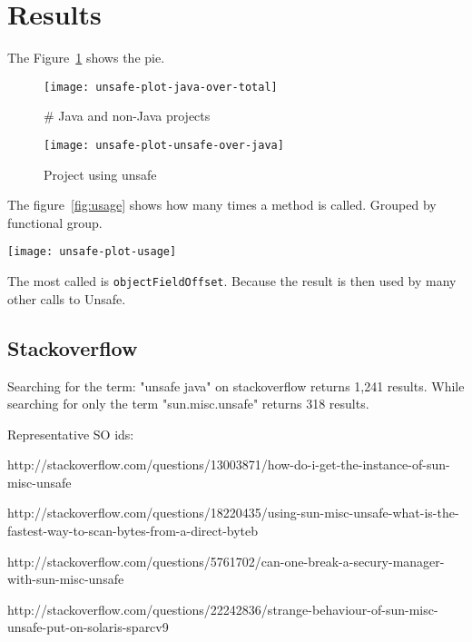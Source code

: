 
\section{Results} \label{sec:results}

The Figure~\ref{fig:java-over-total} shows the pie.

\begin{figure}[htb]
\centering
\texttt{[image: unsafe-plot-java-over-total]}
\caption{\# Java and non-Java projects} \label{fig:java-over-total}
\end{figure}

\begin{figure}[htb]
\centering
\texttt{[image: unsafe-plot-unsafe-over-java]}
\caption{Project using unsafe} \label{fig:unsafe-over-java}
\end{figure}

The figure~\ref{fig:usage} shows how many times a method is called. Grouped by functional group.

\begin{figure*}[htb]
\texttt{[image: unsafe-plot-usage]}
\caption{sun.misc.Unsafe methods usage} \label{fig:usage}
\end{figure*}

The most called is \texttt{objectFieldOffset}. Because the result is then used by many other calls to Unsafe.






\subsection{Stackoverflow}

Searching for the term: "unsafe java" on stackoverflow returns 1,241 results.
While searching for only the term "sun.misc.unsafe" returns 318 results.

Representative SO ids:

http://stackoverflow.com/questions/13003871/how-do-i-get-the-instance-of-sun-misc-unsafe

http://stackoverflow.com/questions/18220435/using-sun-misc-unsafe-what-is-the-fastest-way-to-scan-bytes-from-a-direct-byteb

http://stackoverflow.com/questions/5761702/can-one-break-a-secury-manager-with-sun-misc-unsafe

http://stackoverflow.com/questions/22242836/strange-behaviour-of-sun-misc-unsafe-put-on-solaris-sparcv9

